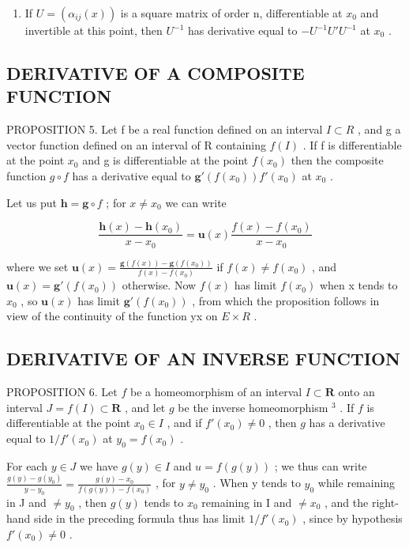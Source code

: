 \begin{enumerate}
\def\labelenumi{\arabic{enumi})}
\setcounter{enumi}{1}
\tightlist
\item
  If \(U = (\alpha_{ij}(x))\) is a square matrix of order n, differentiable at \(x_{0}\) and invertible at this point, then \(U^{-1}\) has derivative equal to \(-U^{-1}U'U^{-1}\) at \(x_{0}\) .
\end{enumerate}

\subsection{DERIVATIVE OF A COMPOSITE FUNCTION}

PROPOSITION 5. Let f be a real function defined on an interval \(I \subset R\) , and g a vector function defined on an interval of R containing \(f(I)\) . If f is differentiable at the point \(x_{0}\) and g is differentiable at the point \(f(x_{0})\) then the composite function \(g \circ f\) has a derivative equal to \(\mathbf{g}'(f(x_{0}))f'(x_{0})\) at \(x_{0}\) .

Let us put \(\mathbf{h} = \mathbf{g} \circ f\) ; for \(x \neq x_0\) we can write

\[
\frac {\mathbf {h} (x) - \mathbf {h} (x _ {0})}{x - x _ {0}} = \mathbf {u} (x) \frac {f (x) - f (x _ {0})}{x - x _ {0}}
\]

where we set \(\mathbf{u}(x)=\frac{\mathbf{g}(f(x))-\mathbf{g}(f(x_{0}))}{f(x)-f(x_{0})}\) if \(f(x)\neq f(x_{0})\) , and \(\mathbf{u}(x)=\mathbf{g}'(f(x_{0}))\) otherwise. Now \(f(x)\) has limit \(f(x_{0})\) when x tends to \(x_{0}\) , so \(\mathbf{u}(x)\) has limit \(\mathbf{g}'(f(x_{0}))\) , from which the proposition follows in view of the continuity of the function yx on \(E\times R\) .

\subsection{DERIVATIVE OF AN INVERSE FUNCTION}

PROPOSITION 6. Let \(f\) be a homeomorphism of an interval \(I \subset \mathbf{R}\) onto an interval \(J = f(I) \subset \mathbf{R}\) , and let \(g\) be the inverse homeomorphism \(^3\) . If \(f\) is differentiable at the point \(x_0 \in I\) , and if \(f'(x_0) \neq 0\) , then \(g\) has a derivative equal to \(1/f'(x_0)\) at \(y_0 = f(x_0)\) .

For each \(y \in J\) we have \(g(y) \in I\) and \(u = f(g(y))\) ; we thus can write \(\frac{g(y) - g(y_0)}{y - y_0} = \frac{g(y) - x_0}{f(g(y)) - f(x_0)}\) , for \(y \neq y_0\) . When y tends to \(y_0\) while remaining in J and \(\neq y_0\) , then \(g(y)\) tends to \(x_0\) remaining in I and \(\neq x_0\) , and the right-hand side in the preceding formula thus has limit \(1/f'(x_0)\) , since by hypothesis \(f'(x_0) \neq 0\) .

